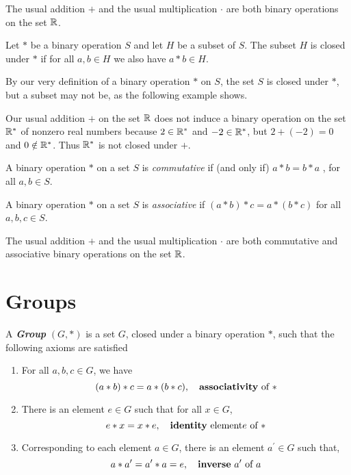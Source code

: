 \begin{example}
    The  usual addition \(+\) and the usual multiplication \(\cdot\) are both binary operations on the set \(\mathbb{R}\).
\end{example}

\begin{mydef}
    Let \(*\) be a binary operation \(S\) and let \(H\) be a subset of \(S\). The subset \(H\) is closed under \(*\) if for all \(a,b \in H\) we also have \(a*b \in H\).
\end{mydef}

By our very definition of a binary operation \(*\) on \(S\), the set \(S\) is closed under \(*\), but a subset may not be, as the following example shows.

\begin{example}
    Our usual addition \(+\) on the set \(\mathbb{R}\) does not induce a binary operation on the set \(\mathbb{R}^*\) of nonzero real numbers because \(2 \in \mathbb{R}^*\) and \(-2 \in \mathbb{R}^*\), but \(2+(-2)=0\) and \(0 \notin \mathbb{R}^*\). Thus \(\mathbb{R}^*\) is not closed under \(+\).
\end{example}

\begin{mydef}
    A binary operation \(*\) on a set \(S\) is \textit{commutative} if (and only if) \(a*b=b*a\) , for all \(a,b \in S\).
\end{mydef}

\begin{mydef}
    A binary operation \(*\) on a set \(S\) is \textit{associative} if \((a*b)*c=a*(b*c)\) for all \(a,b,c \in S\).
\end{mydef}


\begin{example}
    The usual addition \(+\) and the usual multiplication \(\cdot\) are both commutative and associative binary operations on the set \(\mathbb{R}\).
\end{example}

\section{Groups}
\begin{mydef}
    A \textbf{\textit{Group}} \((G,*)\) is a set \(G\), closed under a binary operation \(*\), such that the following axioms are satisfied 
    \begin{enumerate}
    \item For all \(a,b,c \in G\), we have
    \[(a*b)*c=a*(b*c),\quad \text{\textbf{associativity} of } *\]
    
    \item  There is an element \(e \in G\) such that for all \(x \in G\),
    \[e*x=x*e,\quad \text{\textbf{identity} element\(e\) of \(*\)}\]
    
    \item  Corresponding to each element \(a \in G\), there is an element \(a^{\prime} \in G\) such that,
    \[a*a^{\prime}=a^{\prime}*a=e,\quad \text{\textbf{inverse} \(a^{\prime}\) of \(a\)}\]
    \end{enumerate}
\end{mydef}

